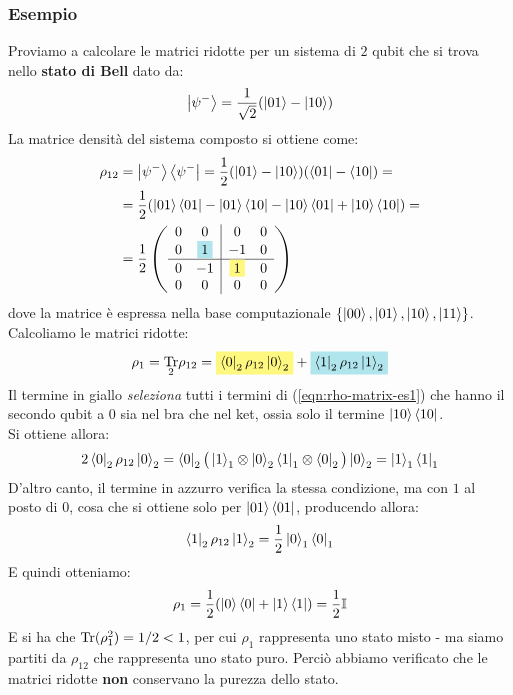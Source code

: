 \documentclass[../../InformazioneQuantistica.tex]{subfiles}
\begin{document}
\subsubsection{Esempio}
Proviamo a calcolare le matrici ridotte per un sistema di $2$ qubit che si trova nello \textbf{stato di Bell} dato da:
\begin{align*}
\Ket{\psi^-}= \frac{1}{\sqrt{2}} (\Ket{01}-\Ket{10})
\end{align*}
La matrice densità del sistema composto si ottiene come:
\begin{align} \nonumber
\rho_{12} &= \ket{\psi^-}\bra{\psi^-} = \frac{1}{2}(\ket{01}-\ket{10})(\bra{01}-\bra{10}) = \\
&= \frac{1}{2}(\ket{01}\bra{01} -\ket{01}\bra{10}-\ket{10}\bra{01}+\ket{10}\bra{10})= \label{eqn:rho-matrix-es1}\\
&= \frac{1}{2}\left(\begin{array}{cc|cc}
0 & 0 & 0 & 0\\
0 & \hlc{SkyBlue}{1} & -1 & 0\\ \hline
0 & -1 & \hlc{Yellow}{1} & 0\\
0 & 0 & 0 & 0
\end{array}\right) \nonumber
\end{align}
dove la matrice è espressa nella base computazionale $\{\Ket{00}, \Ket{01}, \Ket{10}, \Ket{11}\}$.\\

Calcoliamo le matrici ridotte:
\begin{align*}
\rho_1 = \underset{2}{\op{Tr}} \rho_{12} = \hlc{Yellow}{\bra{0}_2 \rho_{12} \ket{0}_2} +\hlc{SkyBlue}{ \bra{1}_2 \rho_{12} \ket{1}_2}
\end{align*}
Il termine in giallo \textit{seleziona} tutti i termini di (\ref{eqn:rho-matrix-es1}) che hanno il secondo qubit a $0$ sia nel bra che nel ket, ossia solo il termine $\Ket{10}\Bra{10}$.\\
Si ottiene allora:
\begin{align*}
2\Bra{0}_2 \rho_{12}\Ket{0}_2 = \Bra{0}_2 \big(\Ket{1}_1 \otimes \Ket{0}_2 \Bra{1}_1 \otimes \Bra{0}_2\big) \Ket{0}_2 = \Ket{1}_1\Bra{1}_1
\end{align*}
 D'altro canto, il termine in azzurro verifica la stessa condizione, ma con $1$ al posto di $0$, cosa che si ottiene solo per $\Ket{01}\Bra{01} $, producendo allora:
\begin{align*}
\Bra{1}_2 \rho_{12}\Ket{1}_2 =\frac{1}{2}\Ket{0}_1\Bra{0}_1
\end{align*}
E quindi otteniamo:
\begin{align*}
\rho_1 = \frac{1}{2}(\Ket{0}\Bra{0} + \Ket{1}\Bra{1}) = \frac{1}{2}\mathbb{I}
\end{align*}
E si ha che $\operatorname{Tr}(\rho_1^2) = 1/2 < 1$, per cui $\rho_1$ rappresenta uno stato misto - ma siamo partiti da $\rho_{12}$ che rappresenta uno stato puro. Perciò abbiamo verificato che le matrici ridotte \textbf{non} conservano la purezza dello stato.\\
\end{document}
